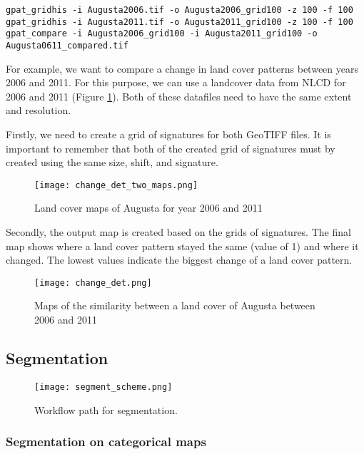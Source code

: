 \begin{minipage}{\linewidth}
\begin{lstlisting}
gpat_gridhis -i Augusta2006.tif -o Augusta2006_grid100 -z 100 -f 100
gpat_gridhis -i Augusta2011.tif -o Augusta2011_grid100 -z 100 -f 100
gpat_compare -i Augusta2006_grid100 -i Augusta2011_grid100 -o Augusta0611_compared.tif
\end{lstlisting}
\end{minipage}

For example, we want to compare a change in land cover patterns between years 2006 and 2011. 
For this purpose, we can use a landcover data from NLCD for 2006 and 2011 (Figure \ref{FIG:CHANGEDET1}).
Both of these datafiles need to have the same extent and resolution.

Firstly, we need to create a grid of signatures for both GeoTIFF files.
It is important to remember that both of the created grid of signatures must by created using the same size, shift, and signature.

\begin{figure}[H]
	\centering
	\texttt{[image: change\_det\_two\_maps.png]}
	\caption{Land cover maps of Augusta for year 2006 and 2011}
	\label{FIG:CHANGEDET1}
\end{figure}

Secondly, the output map is created based on the grids of signatures.
The final map shows where a land cover pattern stayed the same (value of 1) and where it changed. 
The lowest values indicate the biggest change of a land cover pattern.

\begin{figure}[H]
	\centering
	\texttt{[image: change\_det.png]}
	\caption{Maps of the similarity between a land cover of Augusta between 2006 and 2011}
	\label{FIG:CHANGEDET2}
\end{figure}

\FloatBarrier

\subsection{Segmentation}

\begin{figure}[H]
	\centering
	\texttt{[image: segment\_scheme.png]}
	\caption{Workflow path for segmentation.}
	\label{FIG:SEGMENT}
\end{figure}

\subsubsection{Segmentation on categorical maps}

